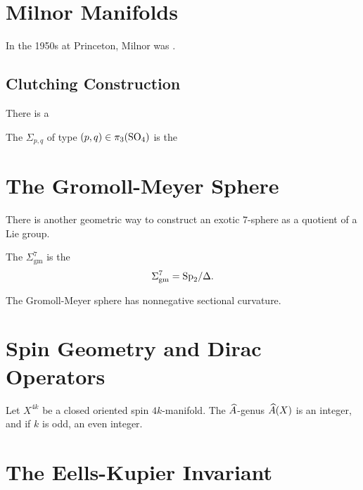 \section{Milnor Manifolds}

\begin{historicalremark*}
  In the 1950s at Princeton, Milnor was \cite{milnor2000exotic}. 
\end{historicalremark*}

\subsection{Clutching Construction}
There is a 


\begin{definition}
	The  $\Sigma_{p,q}$ of type $(p,q)\in \pi_3({\operatorname{SO}}_4)$ is the
\end{definition}

\section{The Gromoll-Meyer Sphere}

There is another geometric way to construct an exotic $7$-sphere as a quotient of a Lie group.

\begin{definition}
	The  $\Sigma_{\mathrm{gm}}^7$ is the 
	\[
      \Sigma_{\mathrm{gm}}^7 = {\operatorname{Sp}}_2/\Delta.
	\]
\end{definition}

\begin{theorem}
  The Gromoll-Meyer sphere has nonnegative sectional curvature.
\end{theorem}

\section{Spin Geometry and Dirac Operators}

\begin{theorem}
  Let $X^{4k}$ be a closed oriented spin $4k$-manifold. The $\widehat{A}$-genus $\widehat{A}(X)$ is an integer, and if $k$ is odd, an even integer.
\end{theorem}

\section{The Eells-Kupier Invariant}

